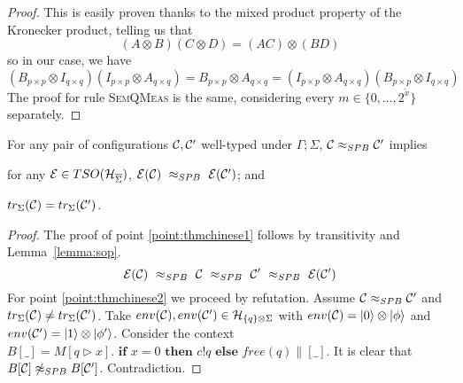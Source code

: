 \begin{proof}
	This is easily proven thanks to the mixed product property of the Kronecker product, telling us that 
	\[ (A \otimes B)(C \otimes D) = (AC)\otimes(BD)
	\]
	so in our case, we have 
	\[
	(B_{p\times p} \otimes I_{q\times q}) (I_{p\times p} \otimes A_{q\times q}) = B_{p\times p} \otimes A_{q \times q} = (I_{p\times p} \otimes A_{q\times q}) (B_{p\times p} \otimes I_{q\times q})
	\]	
The proof for rule {\scshape SemQMeas} is the same, considering every $m \in \{0, \dots, 2^{\widetilde{x}}\}$ separately.
\end{proof}


\begin{theorem}
	For any pair of configurations $\mathcal{C}, \mathcal{C}'$ well-typed under $\Gamma; \Sigma$, 
	$\mathcal{C} \approx_{SPB} \mathcal{C}'$ implies
	\begin{enumerate}
		{\item for any $\mathcal{E} \in TSO(\mathcal{H}_{\overline{\Sigma}})$, $\mathcal{E} (\mathcal{C})\ \approx_{SPB}\ \mathcal{E} (\mathcal{C}')$; and \label{point:thmchinese1}}
		{\item $tr_{\Sigma}(\mathcal{C}) = tr_{\Sigma}(\mathcal{C}')$. \label{point:thmchinese2}}
	\end{enumerate}
\end{theorem}
\begin{proof}
	The proof of point \ref{point:thmchinese1} follows by transitivity and Lemma~\ref{lemma:sop}. 
	\[
	 \sop (\conf)\ \approx_{SPB}\ \conf\ \approx_{SPB}\ \conf'\ \approx_{SPB}\ \sop (\conf') 
	\]
	For point \ref{point:thmchinese2} we proceed by refutation.
	Assume $\mathcal{C} \approx_{SPB} \mathcal{C}'$ and $tr_{\Sigma}(\mathcal{C}) \neq tr_{\Sigma}(\mathcal{C}')$.
	Take $env(\mathcal{C}), env(\mathcal{C}') \in \mathcal{H}_{\{ q \} \otimes \Sigma}$ with $env(\mathcal{C}) = \ket{0} \otimes \ket{\phi}$ and $env(\mathcal{C}') = \ket{1} \otimes \ket{\phi'}$.
	Consider the context $B[\_] = M[q \triangleright x] . \textbf{ if } x = 0 \textbf{ then } c!q \textbf{ else } free(q) \parallel [\_]$.
	It is clear that $B[\mathcal{C}] \not\approx_{SPB} B[\mathcal{C}']$. Contradiction.
\end{proof}

